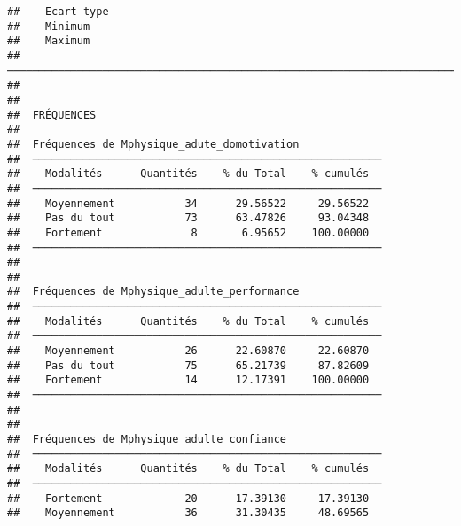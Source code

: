 \documentclass[
]{article}
\begin{document}
\begin{verbatim}
##    Ecart-type                                                                                                                                                                                                                                                                                                             
##    Minimum                                                                                                                                                                                                                                                                                                                
##    Maximum                                                                                                                                                                                                                                                                                                                
##  ──────────────────────────────────────────────────────────────────────────────────────────────────────────────────────────────────────────────────────────────────────────────────────────────────────────────────────────────────────────────────────────────────────────────────────────────────────────────────────── 
## 
## 
##  FRÉQUENCES
## 
##  Fréquences de Mphysique_adute_domotivation              
##  ─────────────────────────────────────────────────────── 
##    Modalités      Quantités    % du Total    % cumulés   
##  ─────────────────────────────────────────────────────── 
##    Moyennement           34      29.56522     29.56522   
##    Pas du tout           73      63.47826     93.04348   
##    Fortement              8       6.95652    100.00000   
##  ─────────────────────────────────────────────────────── 
## 
## 
##  Fréquences de Mphysique_adulte_performance              
##  ─────────────────────────────────────────────────────── 
##    Modalités      Quantités    % du Total    % cumulés   
##  ─────────────────────────────────────────────────────── 
##    Moyennement           26      22.60870     22.60870   
##    Pas du tout           75      65.21739     87.82609   
##    Fortement             14      12.17391    100.00000   
##  ─────────────────────────────────────────────────────── 
## 
## 
##  Fréquences de Mphysique_adulte_confiance                
##  ─────────────────────────────────────────────────────── 
##    Modalités      Quantités    % du Total    % cumulés   
##  ─────────────────────────────────────────────────────── 
##    Fortement             20      17.39130     17.39130   
##    Moyennement           36      31.30435     48.69565   

\end{verbatim}
\end{document}
